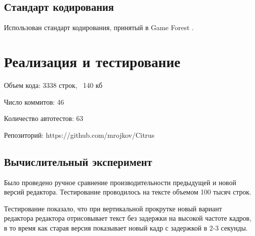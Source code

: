 \documentclass{fefu}
\begin{document}
		\subsection{Стандарт кодирования}
			Использован стандарт кодирования, принятый в Game Forest \cite{CodingConventions}.
	\section{Реализация и тестирование}
		\par Объем кода: 3338 строк, ~140 кб
		\par Число коммитов: 46
		\par Количество автотестов: 63
		\par Репозиторий: https://github.com/mrojkov/Citrus
		\subsection{Вычислительный эксперимент}
			\par Было проведено ручное сравнение производительности предыдущей и новой версий 
			редактора. Тестирование проводилось на тексте объемом 100 тысяч строк.
			\par Тестирование показало, что при вертикальной прокрутке новый вариант редактора
			редактора отрисовывает текст без задержки на высокой частоте кадров, в то время как
			старая версия показывает новый кадр с задержкой в 2-3 секунды.
\end{document}
